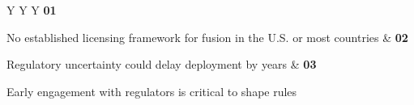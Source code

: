 \documentclass[10pt,a4paper]{article}
\begin{document}
\vspace{5pt}\noindent\begin{tabularx}{\linewidth}{Y Y Y}
{\textcolor{BOGreen}{\bfseries 01}}\par{\scriptsize\color{BOText} No established licensing framework for fusion in the U.S. or most countries} & {\textcolor{BOGreen}{\bfseries 02}}\par{\scriptsize\color{BOText} Regulatory uncertainty could delay deployment by years} & {\textcolor{BOGreen}{\bfseries 03}}\par{\scriptsize\color{BOText} Early engagement with regulators is critical to shape rules} \\
\end{tabularx}\par\vspace{2pt}
\label{chap:4:end}
\end{document}
